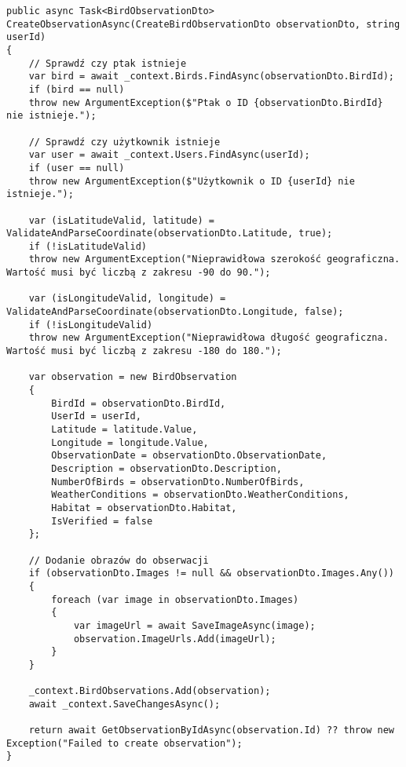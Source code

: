 \begin{lstlisting}[style=csharp, caption={Przykład użycia walidacji danych geograficznych},label={lst:backendwalidacjageograficzna}]
public async Task<BirdObservationDto> CreateObservationAsync(CreateBirdObservationDto observationDto, string userId)
{
	// Sprawdź czy ptak istnieje
	var bird = await _context.Birds.FindAsync(observationDto.BirdId);
	if (bird == null)
	throw new ArgumentException($"Ptak o ID {observationDto.BirdId} nie istnieje.");
	
	// Sprawdź czy użytkownik istnieje
	var user = await _context.Users.FindAsync(userId);
	if (user == null)
	throw new ArgumentException($"Użytkownik o ID {userId} nie istnieje.");
	
	var (isLatitudeValid, latitude) = ValidateAndParseCoordinate(observationDto.Latitude, true);
	if (!isLatitudeValid)
	throw new ArgumentException("Nieprawidłowa szerokość geograficzna. Wartość musi być liczbą z zakresu -90 do 90.");
	
	var (isLongitudeValid, longitude) = ValidateAndParseCoordinate(observationDto.Longitude, false);
	if (!isLongitudeValid)
	throw new ArgumentException("Nieprawidłowa długość geograficzna. Wartość musi być liczbą z zakresu -180 do 180.");
	
	var observation = new BirdObservation
	{
		BirdId = observationDto.BirdId,
		UserId = userId,
		Latitude = latitude.Value,
		Longitude = longitude.Value,
		ObservationDate = observationDto.ObservationDate,
		Description = observationDto.Description,
		NumberOfBirds = observationDto.NumberOfBirds,
		WeatherConditions = observationDto.WeatherConditions,
		Habitat = observationDto.Habitat,
		IsVerified = false
	};
	
	// Dodanie obrazów do obserwacji
	if (observationDto.Images != null && observationDto.Images.Any())
	{
		foreach (var image in observationDto.Images)
		{
			var imageUrl = await SaveImageAsync(image);
			observation.ImageUrls.Add(imageUrl);
		}
	}
	
	_context.BirdObservations.Add(observation);
	await _context.SaveChangesAsync();
	
	return await GetObservationByIdAsync(observation.Id) ?? throw new Exception("Failed to create observation");
}
\end{lstlisting}

\pagebreak

